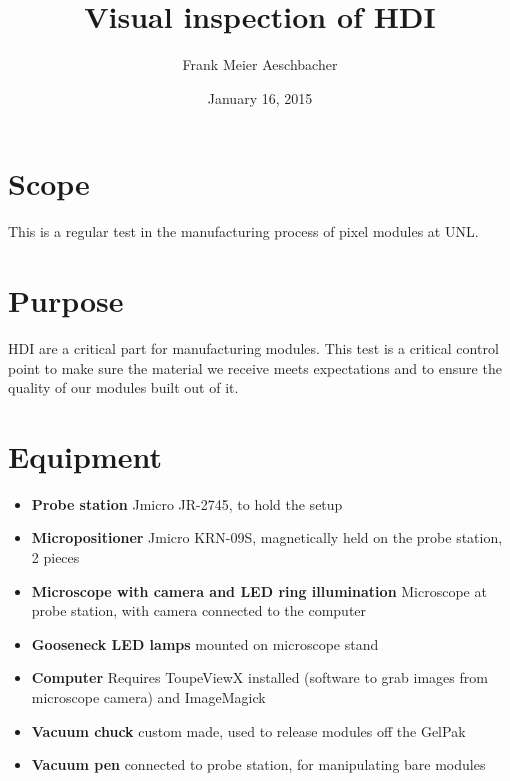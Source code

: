\documentclass[12pt]{unlsilabsop}
\title{Visual inspection of HDI}
\date{January 16, 2015}
\author{Frank Meier Aeschbacher}
\begin{document}
\maketitle

\section{Scope}
This is a regular test in the manufacturing process of pixel modules at UNL.

\section{Purpose}
HDI are a critical part for manufacturing modules. This test is a critical control point to make sure the material we receive meets expectations and to ensure the quality of our modules built out of it.



\section{Equipment}

\begin{itemize}
\item \textbf{Probe station} Jmicro JR-2745, to hold the setup
\item \textbf{Micropositioner} Jmicro KRN-09S, magnetically held on the probe station, 2 pieces
\item \textbf{Microscope with camera and LED ring illumination} Microscope at probe station, with camera connected to the computer
\item \textbf{Gooseneck LED lamps} mounted on microscope stand
\item \textbf{Computer} Requires ToupeViewX installed (software to grab images from microscope camera) and ImageMagick
\item \textbf{Vacuum chuck} custom made, used to release modules off the GelPak
\item \textbf{Vacuum pen} connected to probe station, for manipulating bare modules
\end{itemize}
\end{document}
